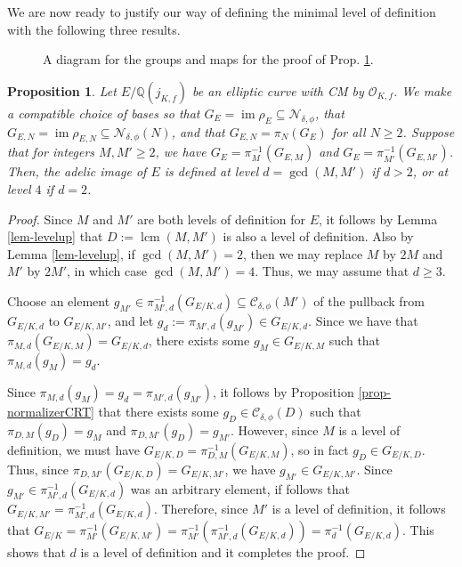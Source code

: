 \documentclass[11pt]{amsart}
\newtheorem{prop}[defn]{Proposition}
\theoremstyle{definition}
\newcommand{\Q}{\mathbb{Q}}
\newcommand{\Of}{\mathcal{O}_{K,f}}
\newcommand{\arrow}{\longrightarrow}
\newcommand{\lcm}{\operatorname{lcm}}
\DeclareMathOperator{\im}{im}  %
\begin{document}
We are now ready to justify our way of defining the minimal level of definition with the following three results.



\begin{figure}[ht!]
    \centering 
{}\caption{A diagram for the groups and maps for the proof of Prop. \ref{prop-levelofdefngcd}.}
\end{figure}



\begin{prop}\label{prop-levelofdefngcd}
    Let $E/\Q(j_{K,f})$ be an elliptic curve with CM by $\Of$. We make a compatible choice of bases so that $G_{E} = \im \rho_{E} \subseteq \mathcal{N}_{\delta, \phi}$, that $G_{E,N}=\im \rho_{E,N} \subseteq \mathcal{N}_{\delta, \phi}(N)$, and that $G_{E, N} = \pi_{N}(G_E)$ for all $N \geq 2$. Suppose that for integers $M, M' \geq 2$, we have $G_{E} = \pi_{M}^{-1}(G_{E, M})$ and $G_{E} = \pi_{M'}^{-1}(G_{E, M'})$. Then, the adelic image of $E$ is defined at level $d = \gcd(M, M')$ if $d>2$, or at level $4$ if $d=2$.
\end{prop}

\begin{proof} Since $M$ and $M'$ are both levels of definition for $E$, it follows by Lemma \ref{lem-levelup} that $D := \lcm(M, M')$ is also a level of definition. Also by Lemma \ref{lem-levelup}, if $\gcd(M,M')=2$, then we may replace $M$ by $2M$ and $M'$ by $2M'$, in which case $\gcd(M,M')=4$. Thus, we may assume that $d \geq 3$.

    Choose an element $g_{M'} \in \pi_{M', d}^{-1}(G_{E/K, d}) \subseteq \mathcal{C}_{\delta, \phi}(M')$ of the pullback from $G_{E/K, d}$ to $G_{E/K, M'}$, and let $g_d := \pi_{M',d}(g_{M'}) \in G_{E/K,d}$. Since we have that $\pi_{M,d}(G_{E/K,M}) = G_{E/K,d}$, there exists some $g_M \in G_{E/K,M}$ such that $\pi_{M,d}(g_{M}) = g_d$.

   Since $\pi_{M,d}(g_{M}) = g_d = \pi_{M',d}(g_{M'})$, it follows by Proposition \ref{prop-normalizerCRT} that there exists some $g_D \in \mathcal{C}_{\delta, \phi}(D)$ such that $\pi_{D,M}(g_D) = g_M$ and $\pi_{D,M'}(g_D) = g_{M'}$. However, since $M$ is a level of definition, we must have $G_{E/K,D} = \pi_{D,M}^{-1}(G_{E/K,M})$, so in fact $g_D \in G_{E/K,D}$. Thus, since $\pi_{D,M'}(G_{E/K,D}) = G_{E/K,M'}$, we have $g_{M'} \in G_{E/K,M'}$. Since $g_{M'} \in \pi_{M', d}^{-1}(G_{E/K, d})$ was an arbitrary element, if follows that $G_{E/K,M'} = \pi_{M', d}^{-1}(G_{E/K, d})$. Therefore, since $M'$ is a level of definition, it follows that $G_{E/K} = \pi_{M'}^{-1}(G_{E/K, M'}) = \pi_{M'}^{-1}(\pi_{M', d}^{-1}(G_{E/K, d})) = \pi_{d}^{-1}(G_{E/K, d})$. This shows that $d$ is a level of definition and it completes the proof.
\end{proof}
\end{document}
